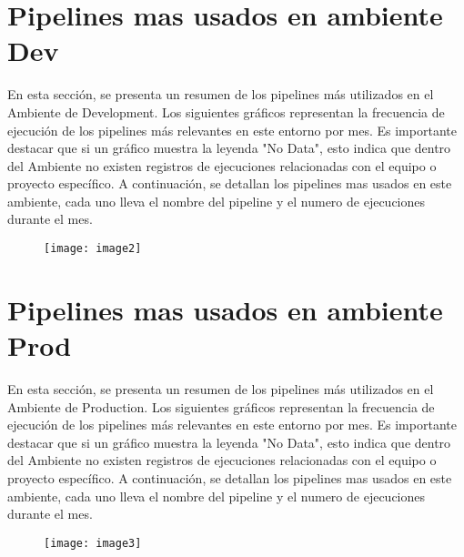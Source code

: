 \documentclass{article}
\begin{document}
\newpage

\section{Pipelines mas usados en ambiente Dev}

\vspace{0.5cm}

En esta sección, se presenta un resumen de los pipelines más utilizados en el Ambiente de Development. Los siguientes gráficos representan la frecuencia de ejecución de los pipelines más relevantes en este entorno por mes.
Es importante destacar que si un gráfico muestra la leyenda "No Data", esto indica que dentro del Ambiente no existen registros de ejecuciones relacionadas con el equipo o proyecto específico.
A continuación, se detallan los pipelines mas usados en este ambiente, cada uno lleva el nombre del pipeline y el numero de ejecuciones durante el mes.

\vspace{0.8cm}

\begin{figure}[H]
    \centering
        \texttt{[image: image2]}\\
\end{figure}

\newpage

\section{Pipelines mas usados en ambiente Prod}

\vspace{0.5cm}

En esta sección, se presenta un resumen de los pipelines más utilizados en el Ambiente de Production. Los siguientes gráficos representan la frecuencia de ejecución de los pipelines más relevantes en este entorno por mes.
Es importante destacar que si un gráfico muestra la leyenda "No Data", esto indica que dentro del Ambiente no existen registros de ejecuciones relacionadas con el equipo o proyecto específico.
A continuación, se detallan los pipelines mas usados en este ambiente, cada uno lleva el nombre del pipeline y el numero de ejecuciones durante el mes.

\vspace{0.8cm}

\begin{figure}[H]
    \centering
        \texttt{[image: image3]}\\
\end{figure}

\vspace{0.5cm}
\end{document}
